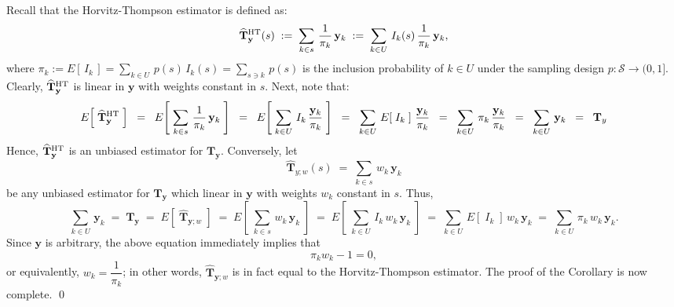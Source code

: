 \documentclass{article}
\begin{document}
\proof
Recall that the Horvitz-Thompson estimator is defined as:
\begin{equation*}
\widehat{\mathbf{T}}^{\textnormal{HT}}_{\mathbf{y}}(s)
\;:=\; \sum_{k \in s}\,\dfrac{1}{\pi_{k}}\,\mathbf{y}_{k}
\;:=\; \sum_{k \in U}\,I_{k}(s)\,\dfrac{1}{\pi_{k}}\,\mathbf{y}_{k},
\end{equation*}
where $\pi_{k} := E\!\left[\,I_{k}\,\right] = \underset{k \in U}{\sum}\,p(s)\,I_{k}(s) = \underset{s \ni k}{\sum}\,p(s)$
is the inclusion probability of $k \in U$ under the sampling design $p : \mathcal{S} \longrightarrow (0,1]$.
Clearly, $\widehat{\mathbf{T}}^{\textnormal{HT}}_{\mathbf{y}}$ is linear in $\mathbf{y}$ with weights constant in $s$.
Next, note that:
\begin{equation*}
E\!\left[\;\widehat{\mathbf{T}}^{\textnormal{HT}}_{\mathbf{y}}\;\right]
\;\;=\;\; E\!\left[\;\sum_{k \in s}\,\dfrac{1}{\pi_{k}}\,\mathbf{y}_{k}\;\right]
\;\;=\;\; E\!\left[\;\sum_{k \in U}\,I_{k}\,\dfrac{\mathbf{y}_{k}}{\pi_{k}}\;\right]
\;\;=\;\; \sum_{k \in U}\,E\!\left[\;I_{k}\;\right]\,\dfrac{\mathbf{y}_{k}}{\pi_{k}}
\;\;=\;\; \sum_{k \in U}\,\pi_{k}\,\dfrac{\mathbf{y}_{k}}{\pi_{k}}
\;\;=\;\; \sum_{k \in U}\,\mathbf{y}_{k} \;\; = \;\; \mathbf{T}_{y}
\end{equation*}
Hence, $\widehat{\mathbf{T}}^{\textnormal{HT}}_{\mathbf{y}}$ is an unbiased estimator for $\mathbf{T}_{\mathbf{y}}$.
Conversely, let
\begin{equation*}
\widehat{\mathbf{T}}_{y;w}(s) \; = \; \sum_{k \in s}\,w_{k}\,\mathbf{y}_{k}
\end{equation*}
be any unbiased estimator for $\mathbf{T}_{\mathbf{y}}$ which linear in $\mathbf{y}$ with weights $w_{k}$ constant in $s$.
Thus,
\begin{equation*}
\sum_{k \in U}\,\mathbf{y}_{k}
\;=\; \mathbf{T}_{\mathbf{y}}
\;=\; E\!\left[\;\widehat{\mathbf{T}}_{\mathbf{y};w}\;\right]
\;=\; E\!\left[\;\sum_{k \in s}\,w_{k}\,\mathbf{y}_{k}\;\right]
\;=\; E\!\left[\;\sum_{k \in U}\,I_{k}\,w_{k}\,\mathbf{y}_{k}\;\right]
\;=\; \sum_{k \in U}\,E\!\left[\;I_{k}\;\right]\,w_{k}\,\mathbf{y}_{k}
\;=\; \sum_{k \in U}\,\pi_{k}\,w_{k}\,\mathbf{y}_{k}.
\end{equation*}
Since $\mathbf{y}$ is arbitrary, the above equation immediately implies that
\begin{equation*}
\pi_{k}w_{k} - 1 = 0,
\end{equation*}
or equivalently, $w_{k} = \dfrac{1}{\pi_{k}}$; in other words,
$\widehat{\mathbf{T}}_{\mathbf{y};w}$ is in fact equal to the Horvitz-Thompson estimator.
The proof of the Corollary is now complete.
\qed
\end{document}
